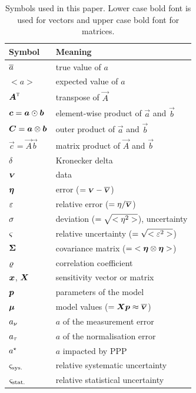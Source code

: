 \documentclass{pasa}
\begin{document}
\begin{table}
\caption{Symbols used in this paper. Lower case bold font is used for vectors and upper case bold font for matrices.}
\begin{tabular}{ll}
\hline\hline
Symbol                        & Meaning\\
\hline
$\overline{a}$                     & true value of $a$\\
$<a>$                         & expected value of $a$\\
${\boldsymbol{A}}^\text{\textsc{t}}$                 & transpose of $\vec A$\\
$\boldsymbol{c} = \boldsymbol{a}\odot\boldsymbol{b}$ & element-wise product of $\vec a$ and $\vec b$\\
$\boldsymbol{C} = \boldsymbol{a}\otimes\boldsymbol{b}$ & outer product of $\vec a$ and $\vec b$\\
$\vec c = \vec A\vec b$       & matrix product of $\vec A$ and $\vec b$\\
$\delta$                      & Kronecker delta\\
\hline
$\boldsymbol{{\scriptstyle V}}$                      & data\\ 
$\boldsymbol{\eta}$                     & error ($= \boldsymbol{{\scriptstyle V}} - \overline{\boldsymbol{{\scriptstyle V}}}$)\\
$\varepsilon$                     & relative error ($= \eta / \overline{\boldsymbol{{\scriptstyle V}}}$)\\
$\sigma$                        & deviation ($= \sqrt{ {<\eta^2>} }$), uncertainty\\
$\varsigma$                       & relative uncertainty ($= \sqrt{ {<\varepsilon^2>} }$)\\
$\boldsymbol{\Sigma}$                       & covariance matrix ($=  {<\boldsymbol{\eta}\otimes\boldsymbol{\eta}>} $)\\
$\varrho$                       & correlation coefficient\\
$\boldsymbol{x}$, $\boldsymbol{X}$            & sensitivity vector or matrix\\
$\boldsymbol{p}$                     & parameters of the model\\
$\boldsymbol{\mu}$                       & model values ($= \boldsymbol{X}\boldsymbol{p}\approx\overline{\boldsymbol{{\scriptstyle V}}}$)\\
\hline
$a_\nu$                      & $a$ of the measurement error\\
$a_\tau$                      & $a$ of the normalisation error\\
$a^\star$                      & $a$ impacted by PPP\\
$\varsigma_\text{sys.}$                     & relative systematic uncertainty\\
$\varsigma_\text{stat.}$                     & relative statistical uncertainty\\
\hline
\end{tabular}
\end{table}
\end{document}
